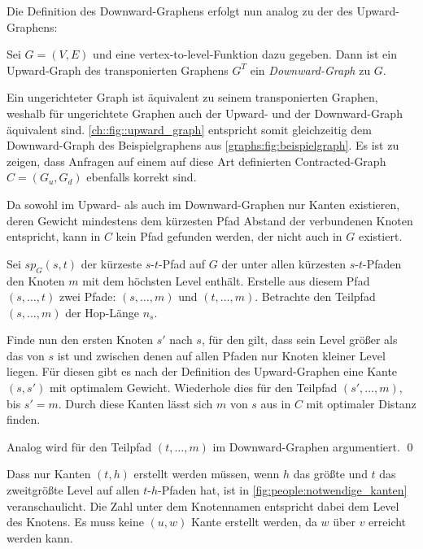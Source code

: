 Die Definition des Downward-Graphens erfolgt nun analog zu der des Upward-Graphens:

\begin{definition}
  Sei $G = (V, E)$ und eine vertex-to-level-Funktion dazu gegeben. Dann ist ein Upward-Graph des transponierten Graphens $G^T$ ein \emph{Downward-Graph} zu $G$.
\end{definition}

Ein ungerichteter Graph ist äquivalent zu seinem transponierten Graphen, weshalb für ungerichtete Graphen auch der Upward- und der Downward-Graph äquivalent sind.
\autoref{ch::fig::upward_graph} entspricht somit gleichzeitig dem Downward-Graph des Beispielgraphens aus \autoref{graphs:fig:beispielgraph}.
Es ist zu zeigen, dass Anfragen auf einem auf diese Art definierten Contracted-Graph $C = (G_u, G_d)$ ebenfalls korrekt sind.

\begin{beweis}
  Da sowohl im Upward- als auch im Downward-Graphen nur Kanten existieren, deren Gewicht mindestens dem kürzesten Pfad Abstand der verbundenen Knoten entspricht, kann in $C$ kein Pfad gefunden werden, der nicht auch in $G$ existiert.

  Sei ${sp}_G(s, t)$ der kürzeste $s$-$t$-Pfad auf $G$ der unter allen kürzesten $s$-$t$-Pfaden den Knoten $m$ mit dem höchsten Level enthält.
  Erstelle aus diesem Pfad $(s, \dotsc, t)$ zwei Pfade: $(s, \dotsc, m)$ und $(t, \dotsc, m)$.
  Betrachte den Teilpfad $(s, \dotsc, m)$ der Hop-Länge $n_s$.

  Finde nun den ersten Knoten $s'$ nach $s$, für den gilt, dass sein Level größer als das von $s$ ist und zwischen denen auf allen Pfaden nur Knoten kleiner Level liegen.
  Für diesen gibt es nach der Definition des Upward-Graphen eine Kante $(s, s')$ mit optimalem Gewicht.
  Wiederhole dies für den Teilpfad $(s', \dotsc, m)$, bis $s' = m$.
  Durch diese Kanten lässt sich $m$ von $s$ aus in $C$ mit optimaler Distanz finden.

  Analog wird für den Teilpfad $(t, \dotsc, m)$ im Downward-Graphen argumentiert.
  \qed
\end{beweis}

Dass nur Kanten $(t, h)$ erstellt werden müssen, wenn $h$ das größte und $t$ das zweitgrößte Level auf allen $t$-$h$-Pfaden hat, ist in \autoref{fig:people:notwendige_kanten} veranschaulicht.
Die Zahl unter dem Knotennamen entspricht dabei dem Level des Knotens.
Es muss keine $(u, w)$ Kante erstellt werden, da $w$ über $v$ erreicht werden kann.

